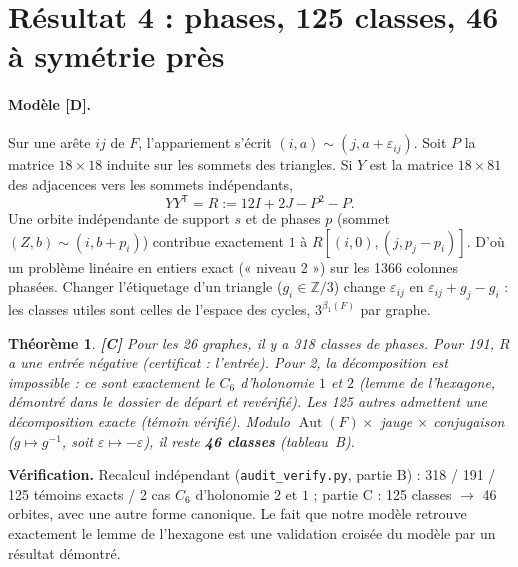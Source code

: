 \documentclass[11pt,a4paper]{article}
\newtheorem{theorem}{Théorème}[section]
\theoremstyle{remark}
\newcommand{\Z}{\mathbb{Z}}
\newcommand{\Aut}{\operatorname{Aut}}
\newcommand{\st}[1]{\textbf{[#1]}}
\newcommand{\code}[1]{\texttt{#1}}
\begin{document}
\section{Résultat 4 : phases, 125 classes, 46 à symétrie près}\label{sec:phases}
\paragraph{Modèle \st{D}.} Sur une arête $ij$ de $F$, l'appariement s'écrit $(i,a)\sim(j,a+\varepsilon_{ij})$. Soit $P$ la matrice $18\times18$ induite sur les
sommets des triangles. Si $Y$ est la matrice $18\times81$ des adjacences vers les sommets indépendants,
\[YY^{\mathsf T}=R:=12I+2J-P^2-P .\]
Une orbite indépendante de support $s$ et de phases $p$ (sommet $(Z,b)\sim(i,b+p_i)$) contribue exactement $1$ à $R[(i,0),(j,p_j-p_i)]$.
D'où un problème linéaire en entiers exact (« niveau 2 ») sur les 1366 colonnes phasées. Changer l'étiquetage d'un triangle ($g_i\in\Z/3$) change
$\varepsilon_{ij}$ en $\varepsilon_{ij}+g_j-g_i$ : les classes utiles sont celles de l'espace des cycles, $3^{\beta_1(F)}$ par graphe.

\begin{theorem} \st{C}
Pour les 26 graphes, il y a 318 classes de phases. Pour 191, $R$ a une entrée négative (certificat : l'entrée). Pour 2, la décomposition est impossible :
ce sont exactement le $C_6$ d'holonomie $1$ et $2$ (lemme de l'hexagone, démontré dans le dossier de départ et revérifié). Les 125 autres admettent une
décomposition exacte (témoin vérifié). Modulo $\Aut(F)\times$ jauge $\times$ conjugaison ($g\mapsto g^{-1}$, soit $\varepsilon\mapsto-\varepsilon$), il reste
\textbf{46 classes} (tableau~B).
\end{theorem}
\textbf{Vérification.} Recalcul indépendant (\code{audit\_verify.py}, partie B) : 318 / 191 / 125 témoins exacts / 2 cas $C_6$ d'holonomie $2$ et $1$ ;
partie C : 125 classes $\to$ 46 orbites, avec une autre forme canonique. Le fait que notre modèle retrouve exactement le lemme de l'hexagone est une
validation croisée du modèle par un résultat démontré.

\end{document}
